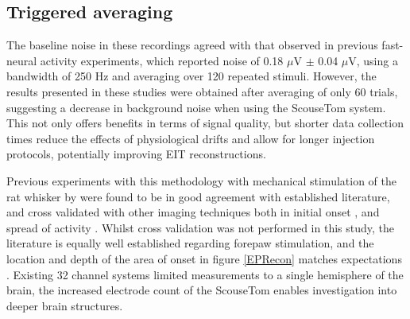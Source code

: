 \subsection{Triggered averaging}
The baseline noise in these recordings agreed with that observed in previous fast-neural activity experiments, which reported noise of 0.18 $\mu$V $\pm$ 0.04 $\mu$V, using a bandwidth of 250 Hz \cite{Oh2011,Packham2016} and averaging over 120 repeated stimuli. However, the results presented in these studies were obtained after averaging of only 60 trials, suggesting a decrease in background noise when using the ScouseTom system. This not only offers benefits in terms of signal quality, but shorter data collection times reduce the effects of physiological drifts and allow for longer injection protocols, potentially improving EIT reconstructions.  

Previous experiments with this methodology with mechanical stimulation of the rat whisker by \citet{Aristovich_2016} were found to be in good agreement with established literature, and cross validated with other imaging techniques both in initial onset \cite{armstrong1991thalamo}, and spread of activity \cite{petersen2007functional}. Whilst cross validation was not performed in this study, the literature is equally well established regarding forepaw stimulation, and the location and depth of the area of onset in figure \ref{EPRecon} matches expectations \cite{peeters2001comparing} \cite{masamoto2007relationship} \cite{lowe2007small}. Existing 32 channel systems limited measurements to a single hemisphere of the brain, the increased electrode count of the ScouseTom enables investigation into deeper brain structures. 
